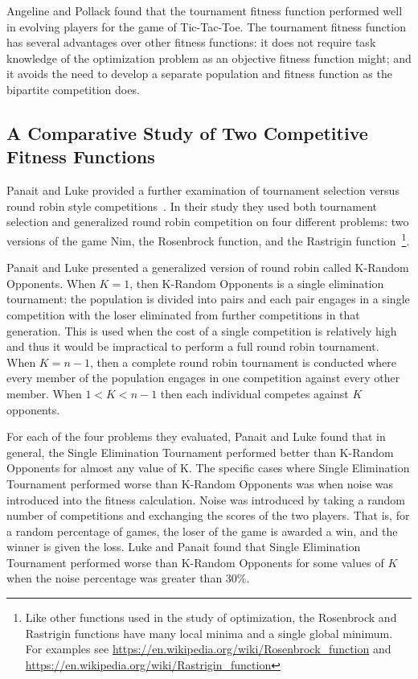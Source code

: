 Angeline and Pollack found that the tournament fitness function performed well
in evolving players for the game of Tic-Tac-Toe. The tournament fitness function
has several advantages over other fitness functions: it does not require task
knowledge of the optimization problem as an objective fitness function might;
and it avoids the need to develop a separate population and fitness function as
the bipartite competition does.

\subsection{A Comparative Study of Two Competitive Fitness Functions}

Panait and Luke provided a further examination of tournament selection versus
round robin style competitions~\cite{Panait02acomparative}. In their study they
used both tournament selection and generalized round robin competition on four
different problems: two versions of the game Nim, the Rosenbrock function, and
the Rastrigin function~\footnote{Like other functions used in the study of
optimization, the Rosenbrock and Rastrigin functions have many local minima and
a single global minimum. For examples see
\url{https://en.wikipedia.org/wiki/Rosenbrock_function} and
\url{https://en.wikipedia.org/wiki/Rastrigin_function}}.

Panait and Luke presented a generalized version of round robin called K-Random
Opponents. When \(K=1\), then K-Random Opponents is a single elimination
tournament: the population is divided into pairs and each pair engages in a
single competition with the loser eliminated from further competitions in that
generation. This is used when the cost of a single competition is relatively
high and thus it would be impractical to perform a full round robin tournament.
When \(K=n-1\), then a complete round robin tournament is conducted where every
member of the population engages in one competition against every other member.
When \(1 < K < n-1\) then each individual competes against \(K\) opponents.

For each of the four problems they evaluated, Panait and Luke found that in
general, the Single Elimination Tournament performed better than K-Random
Opponents for almost any value of K. The specific cases where Single Elimination
Tournament performed worse than K-Random Opponents was when noise was introduced
into the fitness calculation. Noise was introduced by taking a random number of
competitions and exchanging the scores of the two players. That is, for a random
percentage of games, the loser of the game is awarded a win, and the winner is
given the loss. Luke and Panait found that Single Elimination Tournament
performed worse than K-Random Opponents for some values of \(K\) when the noise
percentage was greater than 30\%.

